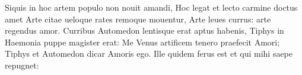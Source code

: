 \documentclass{article}
\begin{document}
\pend
\endnumbering




	



 
 


\newpage





Siquis in hoc artem populo non nouit amandi,
Hoc legat et lecto carmine doctus amet
Arte citae ueloque rates remoque mouentur,
Arte leues currus: arte regendus amor.
Curribus Automedon lentisque erat aptus habenis,
Tiphys in Haemonia puppe magister erat:
Me Venus artificem tenero praefecit Amori;
Tiphys et Automedon dicar Amoris ego.
Ille quidem ferus est et qui mihi saepe repugnet:
\end{document}
